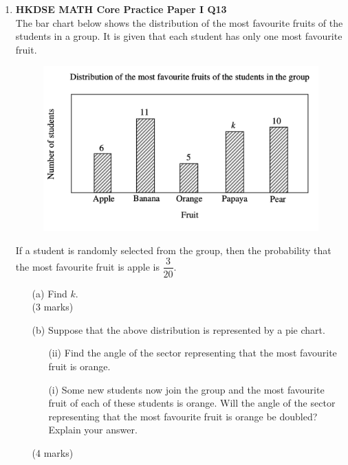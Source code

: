 \documentclass[12pt]{article}
\begin{document}
\begin{enumerate}
	\item \textbf{HKDSE MATH Core Practice Paper I Q13}\\
	The bar chart below shows the distribution of the most favourite fruits of the students in a group. It is given that each student has only one most favourite fruit.
	\begin{figure}[H]
		\centering
		\includegraphics[width = .5\linewidth]{PPFigure1.00}
	\end{figure}
	If a student is randomly selected from the group, then the probability that the most favourite fruit is apple is $\dfrac{3}{20}$.
	\begin{enumerate}
		\item[(a)] Find $k$. \\(3 marks)
		\item[(b)] Suppose that the above distribution is represented by a pie chart.
		\begin{enumerate}
			\item[(ii)] Find the angle of the sector representing that the most favourite fruit is orange.
			\item[(i)] Some new students now join the group and the most favourite fruit of each of these students is orange. Will the angle of the sector representing that the most favourite fruit is orange be doubled? Explain your answer.
		\end{enumerate}
		(4 marks)
	\end{enumerate}


\end{enumerate}
\end{document}
